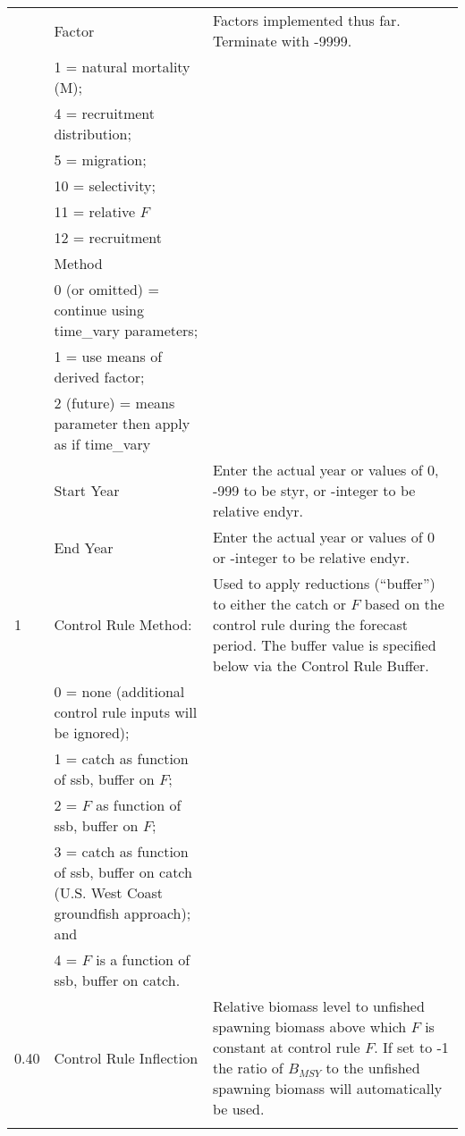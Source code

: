 \begin{landscape}
{\begin{longtable}{p{2cm} p{7cm} p{12cm}}
   & Factor & \multirow{1}{1cm}[-0.15cm]{\parbox{12cm}{Factors implemented thus far. Terminate with -9999.}} \\
   & 1 = natural mortality (M); & \\
   & 4 = recruitment distribution; & \\
   & 5 = migration; & \\
   & 10 = selectivity; & \\
   & 11 = relative $F$ & \\
   & 12 = recruitment & \\

   & Method & \Tstrut\\
   & 0 (or omitted) = continue using time\_vary parameters; & \\
   & 1 = use means of derived factor; & \\
   & 2 (future) = means parameter then apply as if time\_vary & \\
   & Start Year & Enter the actual year or values of 0, -999 to be styr, or -integer to be relative endyr. \\
   & End Year & Enter the actual year or values of 0 or -integer to be relative endyr. \\
  
  \pagebreak
  1 & Control Rule Method: & \multirow{1}{1cm}[-0.15cm]{\parbox{12cm}{Used to apply reductions (``buffer'') to either the catch or $F$ based on the control rule during the forecast period. The buffer value is specified below via the Control Rule Buffer.}} \Tstrut\\
    & 0 = none (additional control rule inputs will be ignored); & \\
    & 1 = catch as function of \gls{ssb}, buffer on $F$; & \\
    & 2 = $F$ as function of \gls{ssb}, buffer on $F$; & \\
    & 3 = catch as function of \gls{ssb}, buffer on catch (U.S. West Coast groundfish approach); and & \\
    & 4 = $F$ is a function of \gls{ssb}, buffer on catch. & \Bstrut\\
  \hline

  0.40 \Tstrut & Control Rule Inflection & \multirow{1}{1cm}[-0.2cm]{\parbox{12cm}{Relative biomass level to unfished spawning biomass above which $F$ is constant at control rule $F$. If set to -1 the ratio of $B_{MSY}$ to the unfished spawning biomass will automatically be used.}} \Bstrut\\
    & & \Tstrut\Bstrut\\


\end{longtable}}
\end{landscape}

